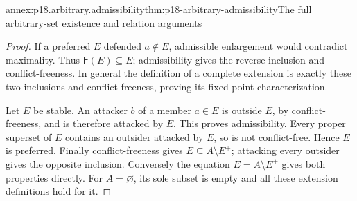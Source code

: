 \begin{annexitem}{annex:p18.arbitrary.admissibility}{thm:p18-arbitrary-admissibility}{The full arbitrary-set existence and relation arguments}
\begin{proof}
If a preferred \(E\) defended \(a\notin E\),
admissible enlargement would contradict maximality.
Thus \(\mathsf F(E)\subseteq E\); admissibility
gives the reverse inclusion and conflict-freeness.
In general the definition of a complete extension
is exactly these two inclusions and conflict-freeness,
proving its fixed-point characterization.

Let \(E\) be stable. An attacker \(b\) of
a member \(a\in E\) is outside \(E\), by
conflict-freeness, and is therefore attacked
by \(E\). This proves admissibility.
Every proper superset of \(E\) contains
an outsider attacked by \(E\), so is
not conflict-free. Hence \(E\) is
preferred. Finally conflict-freeness
gives \(E\subseteq A\setminus E^+\);
attacking every outsider gives the
opposite inclusion. Conversely the
equation \(E=A\setminus E^+\)
gives both properties directly.
For \(A=\varnothing\), its sole
subset is empty and all these
extension definitions hold for it.
\end{proof}
\end{annexitem}

